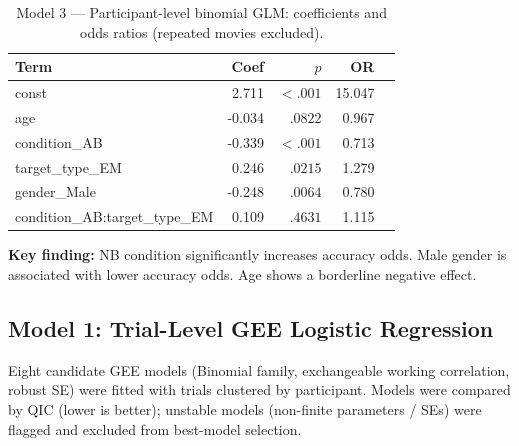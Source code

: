 \documentclass[12pt,a4paper]{article}
\begin{document}
\begin{table}[H]
\centering
\small
\begin{tabular}{lrrrl}
\hline
\textbf{Term} & \textbf{Coef} & \textbf{$p$} & \textbf{OR} \\
\hline

    const & 2.711 & $<.001$ & 15.047 \\

    age & -0.034 & $.0822$ & 0.967 \\

    condition\_AB & -0.339 & $<.001$ & 0.713 \\

    target\_type\_EM & 0.246 & $.0215$ & 1.279 \\

    gender\_Male & -0.248 & $.0064$ & 0.780 \\

    condition\_AB:target\_type\_EM & 0.109 & $.4631$ & 1.115 \\

\hline
\end{tabular}
\caption{Model 3 --- Participant-level binomial GLM: coefficients and odds ratios (repeated movies excluded).}
\end{table}


\noindent\textbf{Key finding:} NB condition significantly increases accuracy odds.
Male gender is associated with lower accuracy odds. Age shows a borderline negative effect.

\subsection{Model 1: Trial-Level GEE Logistic Regression}
Eight candidate GEE models (Binomial family, exchangeable working correlation, robust SE)
were fitted with trials clustered by participant. Models were compared by QIC (lower is better);
unstable models (non-finite parameters / SEs) were flagged and excluded from best-model selection.
\end{document}
